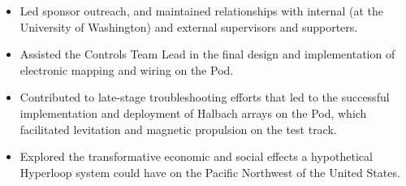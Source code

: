 \documentclass[10pt]{article}
\newcommand{\tabularxwidth}{\textwidth}
\begin{document}
\begin{minipage}{\tabularxwidth}
\begin{itemize}[noitemsep, topsep=3pt, parsep=0pt, partopsep=0pt]
                \item 
    Led sponsor outreach, and maintained relationships with internal (at the University of Washington) and external supervisors and supporters.
            
                \item 
    Assisted the Controls Team Lead in the final design and implementation of electronic mapping and wiring on the Pod.
            
                \item 
    Contributed to late-stage troubleshooting efforts that led to the successful implementation and deployment of Halbach arrays on the Pod, which facilitated levitation and magnetic propulsion on the test track.
            
                \item 
    Explored the transformative economic and social effects a hypothetical Hyperloop system could have on the Pacific Northwest of the United States.
            
        \end{itemize}

        
            \vspace{.5em}
        

    \end{minipage}
    
\end{document}
